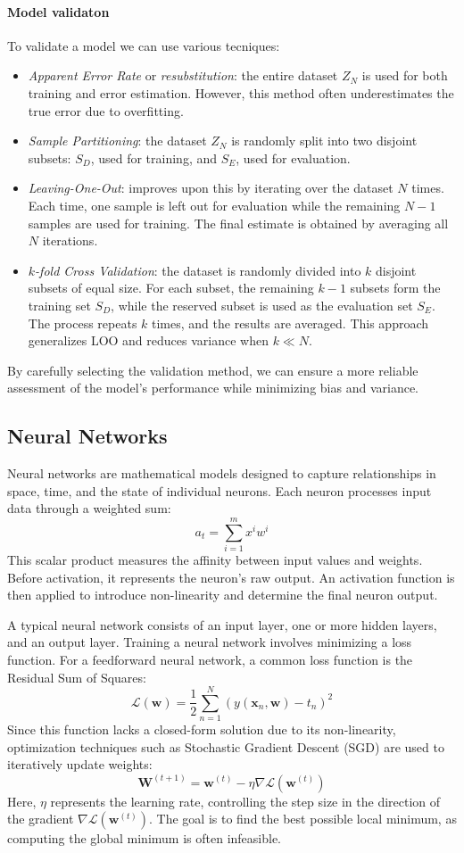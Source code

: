 \paragraph*{Model validaton}
To validate a model we can use various tecniques: 
\begin{itemize}
    \item \textit{Apparent Error Rate} or \textit{resubstitution}: the entire dataset $Z_N$ is used for both training and error estimation. However, this method often underestimates the true error due to overfitting.  
    \item \textit{Sample Partitioning}: the dataset $Z_N$ is randomly split into two disjoint subsets: $S_D$, used for training, and $S_E$, used for evaluation.  
    \item \textit{Leaving-One-Out}: improves upon this by iterating over the dataset $N$ times. 
        Each time, one sample is left out for evaluation while the remaining $N-1$ samples are used for training. 
        The final estimate is obtained by averaging all $N$ iterations.  
    \item \textit{$k$-fold Cross Validation}: the dataset is randomly divided into $k$ disjoint subsets of equal size. 
        For each subset, the remaining $k-1$ subsets form the training set $S_D$, while the reserved subset is used as the evaluation set $S_E$. 
        The process repeats $k$ times, and the results are averaged. This approach generalizes LOO and reduces variance when $k \ll N$.  
\end{itemize}
\noindent By carefully selecting the validation method, we can ensure a more reliable assessment of the model’s performance while minimizing bias and variance.

\subsection{Neural Networks}
Neural networks are mathematical models designed to capture relationships in space, time, and the state of individual neurons. 
Each neuron processes input data through a weighted sum:
\[a_t=\sum_{i=1}^{m}x^iw^i\]
\noindent This scalar product measures the affinity between input values and weights. 
Before activation, it represents the neuron's raw output. An activation function is then applied to introduce non-linearity and determine the final neuron output.

A typical neural network consists of an input layer, one or more hidden layers, and an output layer.
Training a neural network involves minimizing a loss function. 
For a feedforward neural network, a common loss function is the Residual Sum of Squares:
\[\mathcal{L}(\mathbf{w})=\dfrac{1}{2}\sum_{n=1}^{N}\left(y(\mathbf{x}_n,\mathbf{w})-t_n\right)^2\]
Since this function lacks a closed-form solution due to its non-linearity, optimization techniques such as Stochastic Gradient Descent (SGD) are used to iteratively update weights:
\[\mathbf{W}^{(t+1)}=\mathbf{w}^{(t)}-\eta\nabla\mathcal{L}(\mathbf{w}^{(t)})\]
\noindent Here, $\eta$ represents the learning rate, controlling the step size in the direction of the gradient $\nabla\mathcal{L}(\mathbf{w}^{(t)})$. 
The goal is to find the best possible local minimum, as computing the global minimum is often infeasible.

